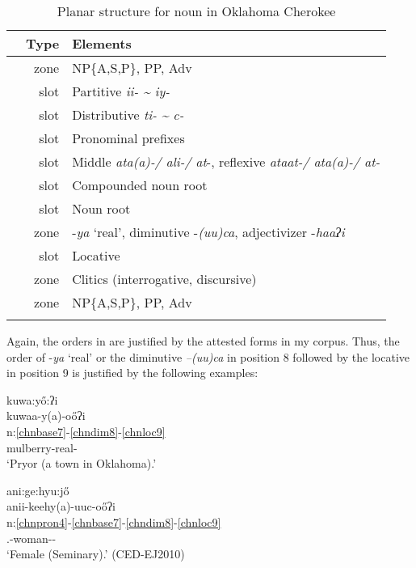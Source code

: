 \documentclass[output=paper]{langscibook}
\begin{document}
\begin{table}[htp]
    \caption{Planar structure for noun in Oklahoma Cherokee}
    \label{tab:cher:plann}
    \begin{tabular}{Trp{9cm}} 
    \lsptoprule   
     & Type & Elements\\ \midrule
\label{chnnp1}     & zone & NP\{A,S,P\}, PP, Adv\\
     & slot & Partitive \textit{ii- {\textasciitilde} iy-}\\
     & slot & Distributive \textit{ti- {\textasciitilde} c-}\\
\label{chnpron4}     & slot & Pronominal prefixes\\
     & slot & Middle \textit{ata(a)-/ ali-/ at}{}-, reflexive \textit{ataat-/ ata(a)-/ at-}\\
     & slot & Compounded noun root\\
\label{chnbase7}     & slot & Noun root\\
\label{chndim8}     & zone & {}-\textit{ya} `real', diminutive -\textit{(uu)ca}, adjectivizer -\textit{haaʔi}\\
\label{chnloc9}     & slot & Locative\\
    \label{chncl10} & zone & Clitics (interrogative, discursive)\\
     & zone & NP\{A,S,P\}, PP, Adv\\
    \lspbottomrule
    \end{tabular}
\end{table}

Again, the orders in  are justified by the attested forms in my corpus. Thus, the order of -\textit{ya} `real' or the diminutive \textit{–(uu)ca} in position 8 followed by the locative in position 9 is justified by the following examples:

\ea\label{ex:cher:key:4} {kuwa:y\H{o}:ʔi} \\
\glll kuwaa-y(a)-o\H{o}ʔi\\
n:\ref{chnbase7}-\ref{chndim8}-\ref{chnloc9} \\  
mulberry-real-\Loc{}\\ 
\glt `Pryor (a town in Oklahoma).' \citep{Feeling1975}
\z 

\ea\label{ex:cher:key:5} {ani:ge:hyu:j\H{o}} \\
\glll anii-keehy(a)-uuc-o\H{o}ʔi\\
n:\ref{chnpron4}-\ref{chnbase7}-\ref{chndim8}-\ref{chnloc9}\\ 
\Third\Pl.\Aarg{}-woman-\Dim{}-\Loc{}\\
\glt `Female (Seminary).' (CED-EJ2010)
\z 
\end{document}
